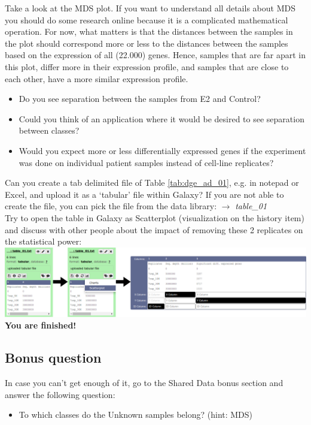 Take a look at the MDS plot.
If you want to understand all details about MDS you should do some research online because it is a complicated mathematical operation.
For now, what matters is that the distances between the samples in the plot should correspond more or less to the distances between the samples based on the expression of all (22.000) genes.
Hence, samples that are far apart in this plot, differ more in their expression profile, and samples that are close to each other, have a more similar expression profile.
\begin{itemize}
	\item Do you see separation between the samples from E2 and Control?
	\item Could you think of an application where it would be desired to see separation between classes?
	\item Would you expect more or less differentially expressed genes if the experiment was done on individual patient samples instead of cell-line replicates?
\end{itemize}
Can you create a tab delimited file of Table \ref{tab:dge_ad_01}, e.g. in notepad or Excel, and upload it as a `tabular' file within Galaxy?
If you are not able to create the file, you can pick the file from the data library:
\datalibrarydirrnaseqadvanced $\rightarrow$ \textit{table\_01}\\
Try to open the table in Galaxy as Scatterplot (visualization on the history item) and discuss with other people about the impact of removing these 2 replicates on the statistical power:\\
\includegraphics[width=\textwidth]{figures/expression_04.png}\\
\textbf{You are finished!}
\subsection{Bonus question}
In case you can't get enough of it, go to the Shared Data bonus section and answer the following question:
\begin{itemize}
	\item To which classes do the Unknown samples belong? (hint: MDS)
\end{itemize}
